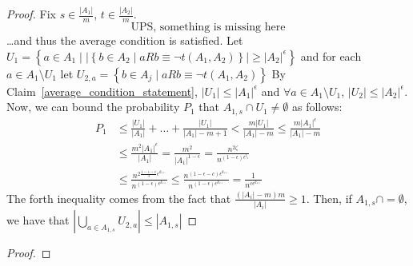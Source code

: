         \begin{proof}
            Fix $s \in \frac{|A_1|}{m}$, $t \in \frac{|A_2|}{m}$.
            \[
                \text{UPS, something is missing here}
            \]
            \dots and thus the average condition is satisfied.
            Let $U_1 = \left\{ a \in A_1 \mid |\left\{ b \in A_2 \mid a R b \equiv \neg t(A_1, A_2) \right\}| \geq |A_2|^\epsilon \right\}$
                and for each $a \in A_1 \setminus U_1$ let $U_{2,a} = \left\{ b \in A_j \mid a R b \equiv \neg t(A_1, A_2) \right\}$
            By Claim~\ref{average_condition_statement}, $|U_1| \leq |A_1|^\epsilon$ and $\forall a \in A_1 \setminus U_1$,
                $|U_2| \leq |A_2|^\epsilon$.
            Now, we can bound the probability $P_1$ that $A_{1,s} \cap U_1 \neq \emptyset$ as follows:
            \[
                \begin{split}
                    P_1
                        & \leq \frac{|U_1|}{|A_1|} + \dots + \frac{|U_1|}{|A_1|-m+1}
                            < \frac{m |U_1|}{|A_1| - m}
                            \leq \frac{m |A_1|^\epsilon}{|A_1| - m} \\
                        & \leq \frac{m^2 |A_1|^\epsilon}{|A_1|}
                            = \frac{m^2}{|A_1|^{1-\epsilon}}
                            = \frac{n^{2 \zeta}}{n^{(1-\epsilon)\epsilon^{l_1}}} \\ %
                        & \leq \frac{n^{2\frac{1-\epsilon-c}{3} \epsilon^{k_{**}}}}{n^{(1-\epsilon)\epsilon^{k_{**}}}}
                            \leq \frac{n^{(1-\epsilon-c) \epsilon^{k_{**}}}}{n^{(1-\epsilon)\epsilon^{k_{**}}}}
                            = \frac{1}{n^{c \epsilon^{k_{**}}}}
                \end{split}
            \]
            The forth inequality comes from the fact that $\frac{(|A_i| - m) m}{|A_i|} \geq 1$.
            Then, if $A_{1,s} \cap = \emptyset$, we have that $|\bigcup_{a \in A_{1,s}} U_{2,a}| \leq |A_{1,s}|$
        \end{proof}

    \remark

    \lemma[Claim 4.14]
        \begin{proof}

        \end{proof}


